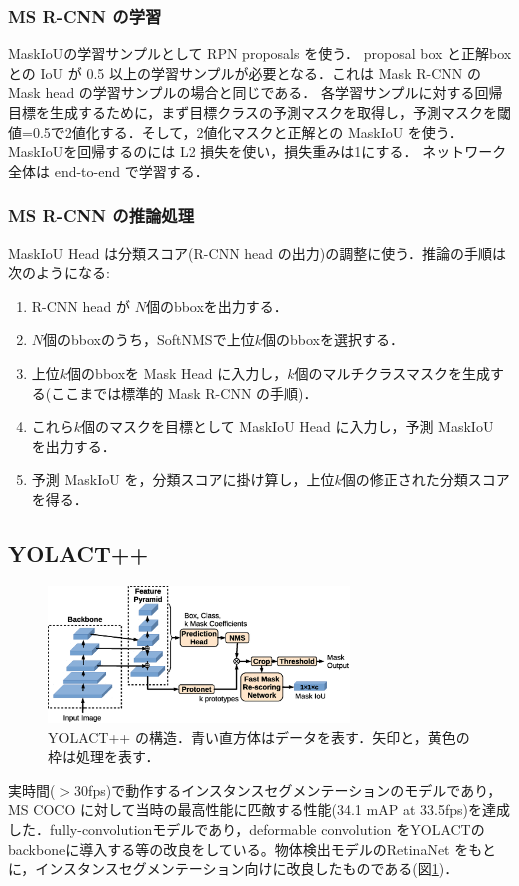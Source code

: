 \documentclass[twocolumn]{jsarticle} %
\begin{document}
\subsubsection{MS R-CNN の学習}
MaskIoUの学習サンプルとして RPN proposals を使う．
proposal box と正解box との IoU が 0.5 以上の学習サンプルが必要となる．これは Mask R-CNN の Mask head の学習サンプルの場合と同じである．
各学習サンプルに対する回帰目標を生成するために，まず目標クラスの予測マスクを取得し，予測マスクを閾値=0.5で2値化する．そして，2値化マスクと正解との MaskIoU を使う．
MaskIoUを回帰するのには L2 損失を使い，損失重みは1にする．
ネットワーク全体は end-to-end で学習する．
\subsubsection{MS R-CNN の推論処理}
MaskIoU Head は分類スコア(R-CNN head の出力)の調整に使う．推論の手順は次のようになる:
\begin{enumerate}
    \item R-CNN head が $N$個のbboxを出力する．
    \item $N$個のbboxのうち，SoftNMS\cite{BSCD17}で上位$k$個のbboxを選択する．
    \item 上位$k$個のbboxを Mask Head に入力し，$k$個のマルチクラスマスクを生成する(ここまでは標準的 Mask R-CNN の手順)．
    \item これら$k$個のマスクを目標として MaskIoU Head に入力し，予測 MaskIoU を出力する．
    \item 予測 MaskIoU を，分類スコアに掛け算し，上位$k$個の修正された分類スコアを得る．
\end{enumerate}

\subsection{YOLACT++ \cite{BZXL20}}
\begin{figure}[tb]
    \begin{center}
        \includegraphics[width=8cm,clip]{fig/archi_YOLACT++.eps}
    \end{center}
    \caption{ YOLACT++ の構造．青い直方体はデータを表す．矢印と，黄色の枠は処理を表す．}
    \label{fig:archi_yolactpp}
\end{figure}  
実時間(${>}$30fps)で動作するインスタンスセグメンテーションのモデルであり，MS COCO に対して当時の最高性能に匹敵する性能(34.1 mAP at 33.5fps)を達成した．fully-convolutionモデルであり，deformable convolution をYOLACT\cite{BZXL19}のbackboneに導入する等の改良をしている。物体検出モデルのRetinaNet\cite{LGGHD17} をもとに，インスタンスセグメンテーション向けに改良したものである(図\ref{fig:archi_yolactpp})．
\end{document}
